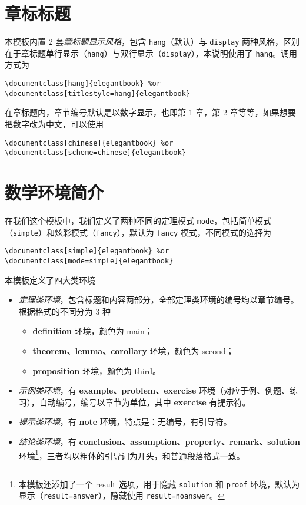 \documentclass[cn,11pt]{elegantbook}
\begin{document}
\section{章标标题}

本模板内置 2 套\textit{章标题显示风格}，包含 \lstinline{hang}（默认）与 \lstinline{display} 两种风格，区别在于章标题单行显示（\lstinline{hang}）与双行显示（\lstinline{display}），本说明使用了 \lstinline{hang}。调用方式为
\begin{lstlisting}
\documentclass[hang]{elegantbook} %or
\documentclass[titlestyle=hang]{elegantbook}
\end{lstlisting}

在章标题内，章节编号默认是以数字显示，也即{\kaishu 第 1 章}，{\kaishu 第 2 章}等等，如果想要把数字改为中文，可以使用
\begin{lstlisting}
\documentclass[chinese]{elegantbook} %or
\documentclass[scheme=chinese]{elegantbook}
\end{lstlisting}

\section{数学环境简介}

在我们这个模板中，我们定义了两种不同的定理模式 \lstinline{mode}，包括简单模式（\lstinline{simple}）和炫彩模式（\lstinline{fancy}），默认为 \lstinline{fancy} 模式，不同模式的选择为
\begin{lstlisting}
\documentclass[simple]{elegantbook} %or
\documentclass[mode=simple]{elegantbook}
\end{lstlisting}

本模板定义了四大类环境

\begin{itemize}
  \item \textit{定理类环境}，包含标题和内容两部分，全部定理类环境的编号均以章节编号。根据格式的不同分为 3 种
    \begin{itemize}
      \item \textcolor{main}{\textbf{definition}} 环境，颜色为 \textcolor{main}{main}；
      \item \textcolor{second}{\textbf{theorem、lemma、corollary}} 环境，颜色为 \textcolor{second} {second}；
      \item \textcolor{third}{\textbf{proposition}} 环境，颜色为 \textcolor{third}{third}。
    \end{itemize}
  \item \textit{示例类环境}，有 \textbf{example、problem、exercise} 环境（对应于例、例题、练习），自动编号，编号以章节为单位，其中 \textbf{exercise} 有提示符。
  \item \textit{提示类环境}，有 \textbf{note} 环境，特点是：无编号，有引导符。
  \item \textit{结论类环境}，有 \textbf{conclusion、assumption、property、remark、solution} 环境\footnote{本模板还添加了一个 result 选项，用于隐藏 \lstinline{solution} 和 \lstinline{proof} 环境，默认为显示（\lstinline{result=answer}），隐藏使用 \lstinline{result=noanswer}。}，三者均以粗体的引导词为开头，和普通段落格式一致。
\end{itemize}
\end{document}
